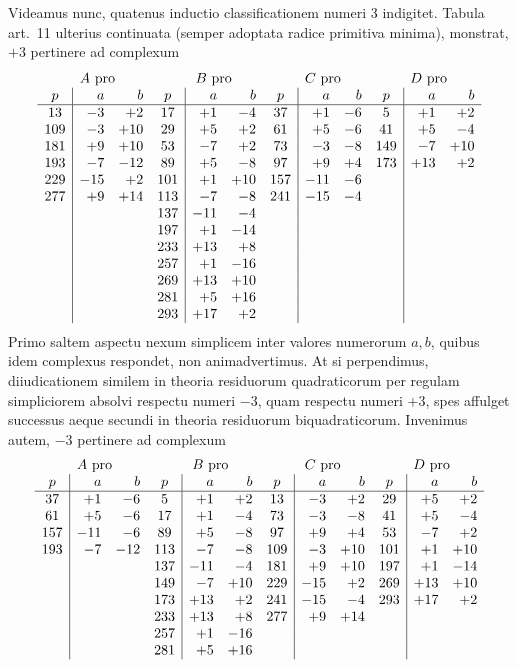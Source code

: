 \documentclass[12pt]{article}
\begin{document}
Videamus nunc, quatenus inductio classificationem numeri $3$ indigitet. Tabula art.~11 ulterius continuata (semper adoptata radice primitiva minima), monstrat, $+3$ pertinere ad complexum
\[
\begin{array}{c|rr@{\quad}c|rr@{\quad}c|rr@{\quad}c|rr}
\multicolumn{3}{c}{A\ \text{pro}}&
\multicolumn{3}{c}{B\ \text{pro}}&
\multicolumn{3}{c}{C\ \text{pro}}&
\multicolumn{3}{c}{D\ \text{pro}}\\
p&a&b&p&a&b&p&a&b&p&a&b\\\hline
13&-3&+2&17&+1&-4&37&+1&-6&5&+1&+2\\
109&-3&+10&29&+5&+2&61&+5&-6&41&+5&-4\\
181&+9&+10&53&-7&+2&73&-3&-8&149&-7&+10\\
193&-7&-12&89&+5&-8&97&+9&+4&173&+13&+2\\
229&-15&+2&101&+1&+10&157&-11&-6&&&\\
277&+9&+14&113&-7&-8&241&-15&-4&&&\\
&&&137&-11&-4&&&&&&\\
&&&197&+1&-14&&&&&&\\
&&&233&+13&+8&&&&&&\\
&&&257&+1&-16&&&&&&\\
&&&269&+13&+10&&&&&&\\
&&&281&+5&+16&&&&&&\\
&&&293&+17&+2&&&&&&
\end{array}
\]
Primo saltem aspectu nexum simplicem inter valores numerorum $a,b$, quibus idem complexus respondet, non animadvertimus. At si perpendimus, diiudicationem similem in theoria residuorum quadraticorum per regulam simpliciorem absolvi respectu numeri $-3$, quam respectu numeri $+3$, spes affulget successus aeque secundi in theoria residuorum biquadraticorum. Invenimus autem, $-3$ pertinere ad complexum
\[
\begin{array}{c|rr@{\quad}c|rr@{\quad}c|rr@{\quad}c|rr}
\multicolumn{3}{c}{A\ \text{pro}}&
\multicolumn{3}{c}{B\ \text{pro}}&
\multicolumn{3}{c}{C\ \text{pro}}&
\multicolumn{3}{c}{D\ \text{pro}}\\
p&a&b&p&a&b&p&a&b&p&a&b\\\hline
37&+1&-6&5&+1&+2&13&-3&+2&29&+5&+2\\
61&+5&-6&17&+1&-4&73&-3&-8&41&+5&-4\\
157&-11&-6&89&+5&-8&97&+9&+4&53&-7&+2\\
193&-7&-12&113&-7&-8&109&-3&+10&101&+1&+10\\
&&&137&-11&-4&181&+9&+10&197&+1&-14\\
&&&149&-7&+10&229&-15&+2&269&+13&+10\\
&&&173&+13&+2&241&-15&-4&293&+17&+2\\
&&&233&+13&+8&277&+9&+14&&&\\
&&&257&+1&-16&&&&&&\\
&&&281&+5&+16&&&&&&
\end{array}
\]
\end{document}
